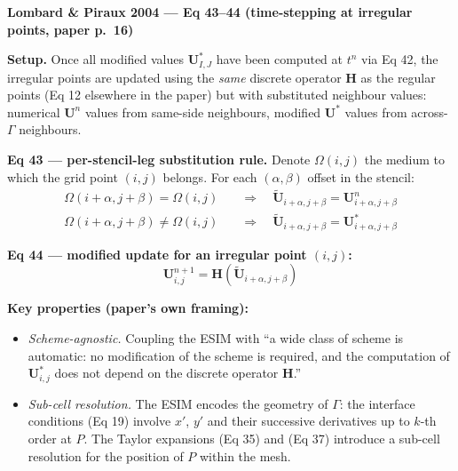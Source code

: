 \textbf{Lombard \& Piraux 2004 --- Eq 43--44 (time-stepping at irregular points, paper p.\ 16)}

\medskip

\textbf{Setup.} Once all modified values $\boldsymbol{U}^*_{I,J}$
have been computed at $t^n$ via Eq 42, the irregular points are
updated using the \emph{same} discrete operator $\boldsymbol{H}$
as the regular points (Eq 12 elsewhere in the paper) but with
substituted neighbour values: numerical $\boldsymbol{U}^n$ values
from same-side neighbours, modified $\boldsymbol{U}^*$ values from
across-$\Gamma$ neighbours.

\medskip

\textbf{Eq 43 --- per-stencil-leg substitution rule.}
Denote $\Omega(i, j)$ the medium to which the grid point $(i, j)$
belongs. For each $(\alpha, \beta)$ offset in the stencil:
\begin{equation*}
\begin{aligned}
  \Omega(i + \alpha, j + \beta) = \Omega(i, j)
    &\quad \Rightarrow \quad
    \tilde{\boldsymbol{U}}_{i+\alpha, j+\beta} = \boldsymbol{U}^n_{i+\alpha, j+\beta} \\
  \Omega(i + \alpha, j + \beta) \neq \Omega(i, j)
    &\quad \Rightarrow \quad
    \tilde{\boldsymbol{U}}_{i+\alpha, j+\beta} = \boldsymbol{U}^*_{i+\alpha, j+\beta}
\end{aligned}
\tag{43}
\end{equation*}

\textbf{Eq 44 --- modified update for an irregular point $(i, j)$:}
\begin{equation*}
  \boxed{\ \boldsymbol{U}^{n+1}_{i, j}
  = \boldsymbol{H} \!\left( \tilde{\boldsymbol{U}}_{i+\alpha, j+\beta} \right)\ }
  \tag{44}
\end{equation*}

\medskip

\textbf{Key properties (paper's own framing):}
\begin{itemize}
  \item \emph{Scheme-agnostic.} Coupling the ESIM with ``a wide
    class of scheme is automatic: no modification of the scheme
    is required, and the computation of $\boldsymbol{U}^*_{i,j}$
    does not depend on the discrete operator $\boldsymbol{H}$.''
  \item \emph{Sub-cell resolution.} The ESIM encodes the geometry
    of $\Gamma$: the interface conditions (Eq 19) involve $x'$,
    $y'$ and their successive derivatives up to $k$-th order at
    $P$. The Taylor expansions (Eq 35) and (Eq 37) introduce a
    sub-cell resolution for the position of $P$ within the mesh.
\end{itemize}

